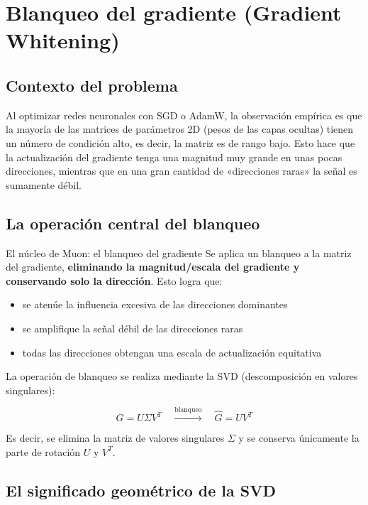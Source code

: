 \section{Blanqueo del gradiente (Gradient Whitening)}

\subsection{Contexto del problema}

Al optimizar redes neuronales con SGD o AdamW, la observación empírica es que la mayoría de las matrices de parámetros 2D (pesos de las capas ocultas) tienen un número de condición alto, es decir, la matriz es de rango bajo. Esto hace que la actualización del gradiente tenga una magnitud muy grande en unas pocas direcciones, mientras que en una gran cantidad de «direcciones raras» la señal es sumamente débil.

\subsection{La operación central del blanqueo}

\begin{importantbox}{El núcleo de Muon: el blanqueo del gradiente}
Se aplica un blanqueo a la matriz del gradiente, \textbf{eliminando la magnitud/escala del gradiente y conservando solo la dirección}. Esto logra que:
\begin{itemize}
  \item se atenúe la influencia excesiva de las direcciones dominantes
  \item se amplifique la señal débil de las direcciones raras
  \item todas las direcciones obtengan una escala de actualización equitativa
\end{itemize}
\end{importantbox}

La operación de blanqueo se realiza mediante la SVD (descomposición en valores singulares):

$$
G = U \Sigma V^T \quad \xrightarrow{\text{blanqueo}} \quad \hat{G} = U V^T
$$

Es decir, se elimina la matriz de valores singulares $\Sigma$ y se conserva únicamente la parte de rotación $U$ y $V^T$.

\subsection{El significado geométrico de la SVD}

